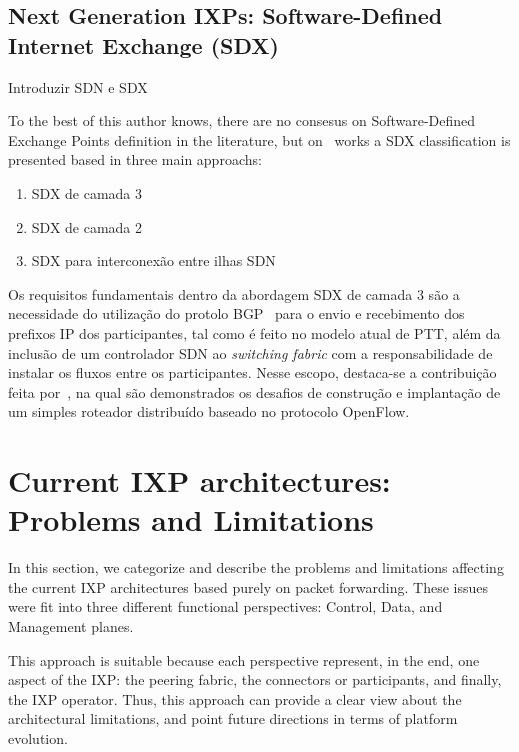 \documentclass[conference]{IEEEtran/IEEEtran}
\begin{document}

\subsection{Next Generation IXPs: Software-Defined Internet Exchange (SDX)}
Introduzir SDN e SDX

To the best of this author knows, there are no consesus on Software-Defined Exchange Points definition in the literature, but on~\cite{chungatlanticwave} works a SDX classification is presented based in three main approachs:
\begin{enumerate}
\item SDX de camada 3
\item SDX de camada 2
\item SDX para interconexão entre ilhas SDN
\end{enumerate}

Os requisitos fundamentais dentro da abordagem SDX de camada 3 são a necessidade do utilização do protolo BGP~\cite{rfc4271} para o envio e recebimento dos prefixos IP dos participantes, tal como é feito no modelo atual de PTT, além da inclusão de um controlador SDN ao \textit{switching fabric} com a responsabilidade de instalar os fluxos entre os participantes. Nesse escopo, destaca-se a contribuição feita por~\cite{stringer2013cardigan}, na qual são demonstrados os desafios de construção e implantação de um simples roteador distribuído baseado no protocolo OpenFlow.


\section{Current IXP architectures: Problems and Limitations}
\label{current_ixp}
In this section, we categorize and describe the problems and limitations affecting the current IXP architectures based purely on packet forwarding. These issues were fit into three different functional perspectives: Control, Data, and Management planes. 

This approach is suitable because each perspective represent, in the end, one aspect of the IXP: the peering fabric, the connectors or participants, and finally, the IXP operator. Thus, this approach can provide a clear view about the architectural limitations, and point future directions in terms of platform evolution. 
\end{document}
